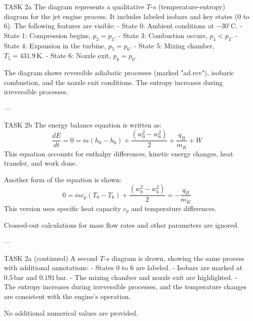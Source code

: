 TASK 2a  
The diagram represents a qualitative \( T \)-\( s \) (temperature-entropy) diagram for the jet engine process. It includes labeled isobars and key states (0 to 6). The following features are visible:  
- State 0: Ambient conditions at \( -30^\circ\text{C} \).  
- State 1: Compression begins, \( p_2 = p_3 \).  
- State 3: Combustion occurs, \( p_4 < p_3 \).  
- State 4: Expansion in the turbine, \( p_5 = p_6 \).  
- State 5: Mixing chamber, \( T_5 = 431.9 \, \text{K} \).  
- State 6: Nozzle exit, \( p_6 = p_0 \).  

The diagram shows reversible adiabatic processes (marked "ad.rev"), isobaric combustion, and the nozzle exit conditions. The entropy increases during irreversible processes.  

---

TASK 2b  
The energy balance equation is written as:  
\[
\frac{dE}{dt} = 0 = \dot{m} \left( h_0 - h_6 \right) + \frac{\left( w_0^2 - w_6^2 \right)}{2} + \frac{q_{B}}{\dot{m}_K} + W
\]  
This equation accounts for enthalpy differences, kinetic energy changes, heat transfer, and work done.  

Another form of the equation is shown:  
\[
0 = \dot{m} c_p \left( T_0 - T_6 \right) + \frac{\left( w_0^2 - w_6^2 \right)}{2} = -\frac{q_{B}}{\dot{m}_K}
\]  
This version uses specific heat capacity \( c_p \) and temperature differences.  

Crossed-out calculations for mass flow rates and other parameters are ignored.  

---

TASK 2a (continued)  
A second \( T \)-\( s \) diagram is drawn, showing the same process with additional annotations:  
- States 0 to 6 are labeled.  
- Isobars are marked at \( 0.5 \, \text{bar} \) and \( 0.191 \, \text{bar} \).  
- The mixing chamber and nozzle exit are highlighted.  
- The entropy increases during irreversible processes, and the temperature changes are consistent with the engine's operation.  

No additional numerical values are provided.